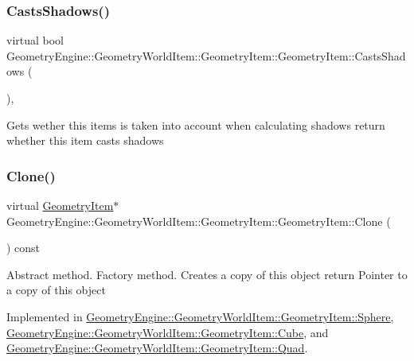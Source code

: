 \subsubsection{\texorpdfstring{CastsShadows()}{CastsShadows()}}
{\footnotesize\ttfamily virtual bool Geometry\+Engine\+::\+Geometry\+World\+Item\+::\+Geometry\+Item\+::\+Geometry\+Item\+::\+Casts\+Shadows (\begin{DoxyParamCaption}{ }\end{DoxyParamCaption})\hspace{0.3cm}{\ttfamily [inline]}, {\ttfamily [virtual]}}

Gets wether this items is taken into account when calculating shadows return whether this item casts shadows \mbox{\label{class_geometry_engine_1_1_geometry_world_item_1_1_geometry_item_1_1_geometry_item_a1db8f97339ba49f746b3e0b4c4b02748}} 
\subsubsection{\texorpdfstring{Clone()}{Clone()}}
{\footnotesize\ttfamily virtual \mbox{\hyperlink{class_geometry_engine_1_1_geometry_world_item_1_1_geometry_item_1_1_geometry_item}{Geometry\+Item}}$\ast$ Geometry\+Engine\+::\+Geometry\+World\+Item\+::\+Geometry\+Item\+::\+Geometry\+Item\+::\+Clone (\begin{DoxyParamCaption}{ }\end{DoxyParamCaption}) const\hspace{0.3cm}{\ttfamily [pure virtual]}}

Abstract method. Factory method. Creates a copy of this object return Pointer to a copy of this object 

Implemented in \mbox{\hyperlink{class_geometry_engine_1_1_geometry_world_item_1_1_geometry_item_1_1_sphere_aaf5b7221c60ac1feefaacff14a20c1f3}{Geometry\+Engine\+::\+Geometry\+World\+Item\+::\+Geometry\+Item\+::\+Sphere}}, \mbox{\hyperlink{class_geometry_engine_1_1_geometry_world_item_1_1_geometry_item_1_1_cube_ab151cd962c45bc06d21e9e26c2d1c4aa}{Geometry\+Engine\+::\+Geometry\+World\+Item\+::\+Geometry\+Item\+::\+Cube}}, and \mbox{\hyperlink{class_geometry_engine_1_1_geometry_world_item_1_1_geometry_item_1_1_quad_ad3a6d04a38253d1f26735a87a53a5446}{Geometry\+Engine\+::\+Geometry\+World\+Item\+::\+Geometry\+Item\+::\+Quad}}.

